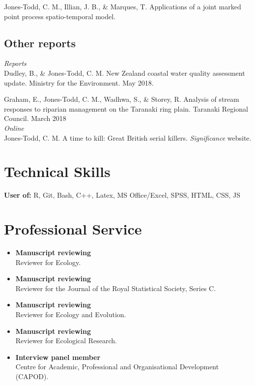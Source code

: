 \documentclass[10pt,a4paper]{moderncv}
\begin{document}
\vspace{-3pt}

Jones-Todd, C. M., Illian, J. B., \& Marques, T. Applications of a joint marked point process spatio-temporal model.\\



\subsection{Other reports}

\vspace{5pt}

\textit{\small{Reports}}\\

Dudley, B., \& Jones-Todd, C. M. New Zealand coastal water quality assessment update. Ministry for the Environment. May 2018.

Graham, E., Jones-Todd, C. M., Wadhwa, S., \& Storey, R. Analysis of stream responses to riparian management on the Taranaki ring plain. Taranaki Regional Council. March 2018\\

\textit{\small{Online}}\\

Jones-Todd, C. M. A time to kill: Great British serial killers. \textit{Significance} website.

\vspace{5pt}



\section{Technical Skills}

\vspace{6pt}
    \textbf{User of:} R, Git, Bash, C++, Latex, MS Office/Excel, SPSS, HTML, CSS, JS

\newpage
\section{Professional Service}

\vspace{6pt}

\begin{itemize}
  \item \textbf{Manuscript reviewing}\\
Reviewer for Ecology.
 \item \textbf{Manuscript reviewing}\\
Reviewer for the Journal of the Royal Statistical Society, Series C.
 \item \textbf{Manuscript reviewing}\\
   Reviewer for Ecology and Evolution.
   \item \textbf{Manuscript reviewing}\\
Reviewer for Ecological Research.
\item \textbf{Interview panel member}\\
 Centre for Academic, Professional and Organisational Development (CAPOD).
\end{itemize}
\end{document}
